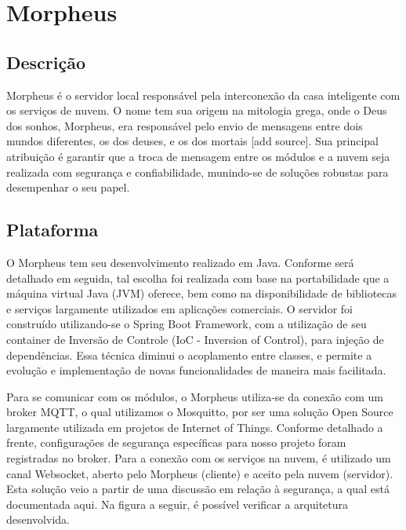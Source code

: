 \section{Morpheus}

\subsection{Descrição}
Morpheus é o servidor local responsável pela interconexão da casa inteligente com os serviços de nuvem. O nome tem sua origem na mitologia grega, onde o Deus dos sonhos, Morpheus, era responsável pelo envio de mensagens entre dois mundos diferentes, os dos deuses, e os dos mortais [add source]. Sua principal atribuição é garantir que a troca de mensagem entre os módulos e a nuvem seja realizada com segurança e confiabilidade, munindo-se de soluções robustas para desempenhar o seu papel.

\subsection{Plataforma}
O Morpheus tem seu desenvolvimento realizado em Java. Conforme será detalhado em seguida, tal escolha foi realizada com base na portabilidade que a máquina virtual Java (JVM) oferece, bem como na disponibilidade de bibliotecas e serviços largamente utilizados em aplicações comerciais. O servidor foi construído utilizando-se o Spring Boot Framework, com a utilização de seu container de Inversão de Controle (IoC - Inversion of Control), para injeção de dependências. Essa técnica diminui o acoplamento entre classes, e permite a evolução e implementação de novas funcionalidades de maneira mais facilitada. 

Para se comunicar com os módulos, o Morpheus utiliza-se da conexão com um broker MQTT, o qual utilizamos o Mosquitto, por ser uma solução Open Source largamente utilizada em projetos de Internet of Things. Conforme detalhado a frente, configurações de segurança específicas para nosso projeto foram registradas no broker. Para a conexão com os serviços na nuvem, é utilizado um canal Websocket, aberto pelo Morpheus (cliente) e aceito pela nuvem (servidor). Esta solução veio a partir de uma discussão em relação à segurança, a qual está documentada aqui. Na figura a seguir, é possível verificar a arquitetura desenvolvida.

